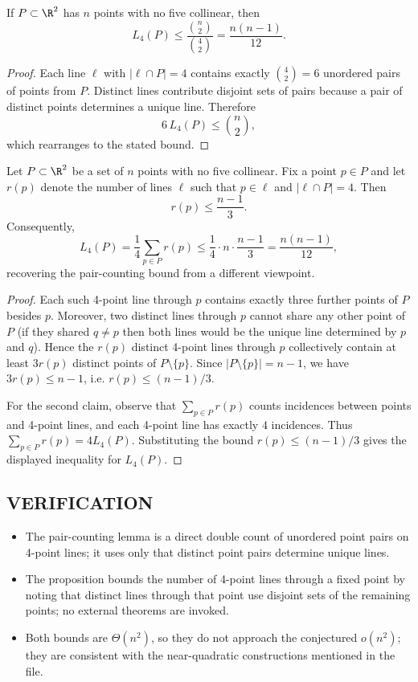 \begin{lemma}
If $P\subset\R^2$ has $n$ points with no five collinear, then
\[L_4(P)\le \frac{\binom{n}{2}}{\binom{4}{2}}=\frac{n(n-1)}{12}.
\]
\end{lemma}

\begin{proof}
Each line $\ell$ with $|\ell\cap P|=4$ contains exactly $\binom{4}{2}=6$ unordered pairs of points from $P$.
Distinct lines contribute disjoint sets of pairs because a pair of distinct points determines a unique line.
Therefore
\[6\,L_4(P)\le \binom{n}{2},
\]
which rearranges to the stated bound.
\end{proof}

\begin{proposition}
Let $P\subset\R^2$ be a set of $n$ points with no five collinear.
Fix a point $p\in P$ and let $r(p)$ denote the number of lines $\ell$ such that $p\in\ell$ and $|\ell\cap P|=4$.
Then
\[r(p)\le \frac{n-1}{3}.\]
Consequently,
\[L_4(P)=\frac14\sum_{p\in P} r(p)\le \frac14\cdot n\cdot \frac{n-1}{3}=\frac{n(n-1)}{12},\]
recovering the pair-counting bound from a different viewpoint.
\end{proposition}

\begin{proof}
Each such 4-point line through $p$ contains exactly three further points of $P$ besides $p$.
Moreover, two distinct lines through $p$ cannot share any other point of $P$ (if they shared $q\ne p$ then both lines would be the unique line determined by $p$ and $q$).
Hence the $r(p)$ distinct 4-point lines through $p$ collectively contain at least $3r(p)$ distinct points of $P\setminus\{p\}$.
Since $|P\setminus\{p\}|=n-1$, we have $3r(p)\le n-1$, i.e. $r(p)\le (n-1)/3$.

For the second claim, observe that $\sum_{p\in P} r(p)$ counts incidences between points and 4-point lines, and each 4-point line has exactly $4$ incidences.
Thus $\sum_{p\in P} r(p)=4L_4(P)$.
Substituting the bound $r(p)\le (n-1)/3$ gives the displayed inequality for $L_4(P)$.
\end{proof}

\subsection*{VERIFICATION}
\begin{itemize}[leftmargin=2em]
\item The pair-counting lemma is a direct double count of unordered point pairs on 4-point lines; it uses only that distinct point pairs determine unique lines.
\item The proposition bounds the number of 4-point lines through a fixed point by noting that distinct lines through that point use disjoint sets of the remaining points; no external theorems are invoked.
\item Both bounds are $\Theta(n^2)$, so they do not approach the conjectured $o(n^2)$; they are consistent with the near-quadratic constructions mentioned in the file.
\end{itemize}

